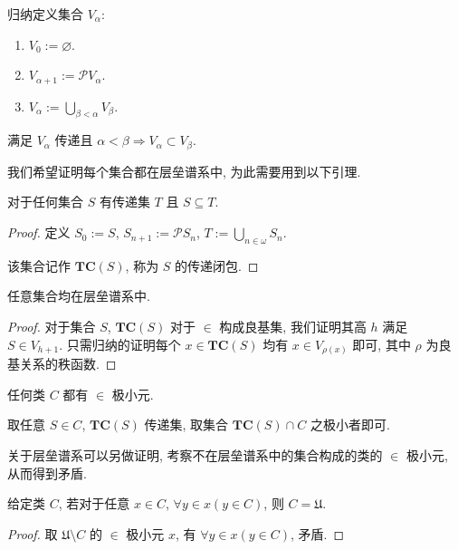 \begin{definition}
    归纳定义集合 \(V_\alpha\):

    \begin{enumerate}
        \item \(V_0 := \varnothing\).
        \item \(V_{\alpha + 1} := \mathcal{P} V_\alpha\).
        \item \(V_\alpha := \bigcup_{\beta < \alpha} V_\beta\).
    \end{enumerate}

    满足 \(V_\alpha\) 传递且 \(\alpha < \beta \Rightarrow V_\alpha \subset V_\beta\).
\end{definition}

我们希望证明每个集合都在层垒谱系中, 为此需要用到以下引理.

\begin{lemma}
    对于任何集合 \(S\) 有传递集 \(T\) 且 \(S \subseteq T\).

    \begin{proof}
        定义 \(S_0 := S\), \(S_{n + 1} := \mathcal{P} S_n\), \(T := \bigcup_{n \in \omega} S_n\).

        该集合记作 \(\mathbf{TC}(S)\), 称为 \(S\) 的传递闭包.
    \end{proof}
\end{lemma}

\begin{lemma}
    任意集合均在层垒谱系中.

    \begin{proof}
        对于集合 \(S\), \(\mathbf{TC}(S)\) 对于 \(\in\) 构成良基集, 我们证明其高 \(h\) 满足 \(S \in V_{h + 1}\).
        只需归纳的证明每个 \(x \in \mathbf{TC}(S)\) 均有 \(x \in V_{\rho (x)}\) 即可, 其中 \(\rho\) 为良基关系的秩函数.
    \end{proof}
\end{lemma}

\begin{lemma}
    任何类 \(C\) 都有 \(\in\) 极小元.

    取任意 \(S \in C\), \(\mathbf{TC}(S)\) 传递集, 取集合 \(\mathbf{TC}(S) \cap C\) 之极小者即可.
\end{lemma}

关于层垒谱系可以另做证明, 考察不在层垒谱系中的集合构成的类的 \(\in\) 极小元, 从而得到矛盾.

\begin{theorem}[\(\in\) 归纳]
    \label {theorem:in's induction}
    给定类 \(C\), 若对于任意 \(x \in C\), \(\forall y \in x (y \in C)\), 则 \(C = \mathfrak{U}\).

    \begin{proof}
        取 \(\mathfrak{U} \setminus C\) 的 \(\in\) 极小元 \(x\), 有 \(\forall y \in x (y \in C)\), 矛盾.
    \end{proof}
\end{theorem}

